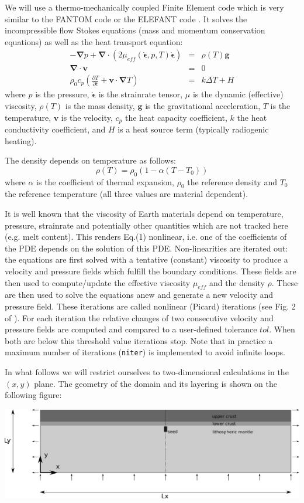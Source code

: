 \documentclass[a4paper]{article}
\begin{document}
We will use a thermo-mechanically coupled Finite Element code which is very similar to the FANTOM code  \cite{thie11} or the ELEFANT code \cite{latb17}. It solves the incompressible flow Stokes equations (mass and momentum conservation equations) as well as the heat transport equation:
\begin{eqnarray}
-{\bm \nabla}p + {\bm \nabla} \cdot (2\mu_{eff}(\dot{\bm \epsilon},p,T)\dot{\bm \epsilon}) &=& \rho(T) {\bm g} \\
{\bm \nabla}\cdot {\bm v} &=& 0 \\
\rho_0 c_p \left(\frac{\partial T}{\partial t} + {\bm v}\cdot{\bm \nabla} T \right) &=& k \Delta T +H
\end{eqnarray}
where $p$ is the pressure, $\dot{\bm \epsilon}$ is the strainrate tensor, $\mu$ is the dynamic (effective) viscosity, $\rho(T)$ is the mass density, ${\bm g}$ is the gravitational acceleration, $T$ is the temperature, ${\bm v}$ is the velocity, $c_p$ the heat capacity coefficient, $k$ the heat conductivity coefficient, and $H$ is a heat source term (typically radiogenic heating).

The density depends on temperature as follows:
\[
\rho(T) = \rho_0 (1-\alpha(T-T_0))
\]
where $\alpha$ is the coefficient of thermal expansion, $\rho_0$ the reference density and $T_0$ the reference temperature
(all three values are material dependent).

It is well known that the viscosity of Earth materials depend on temperature, pressure, strainrate and potentially other quantities which are not tracked here (e.g. melt content). This renders Eq.(1) nonlinear, i.e. one of the coefficients of the PDE depends on the solution of this PDE. Non-linearities are iterated out: the equations are first solved with a tentative (constant) viscosity to produce a velocity and pressure fields which fulfill the boundary conditions. These fields are then used to compute/update the effective viscosity $\mu_{eff}$ and the density $\rho$. These are then used to solve the equations anew and generate a new velocity and pressure field. These iterations are called nonlinear (Picard) iterations (see Fig. 2 of \cite{thie11}). For each iteration the relative changes of two consecutive velocity and pressure  fields are computed and compared to a user-defined tolerance $tol$. When both are below this threshold value iterations stop. Note that in practice a maximum number of iterations ({\tt niter}) is implemented to avoid infinite loops.

In what follows we will restrict ourselves to two-dimensional calculations in the $(x,y)$ plane. The geometry of the domain and its layering is shown on the following figure:
\begin{center}
\includegraphics[width=15cm]{images/drawing}
\end{center}
 
\end{document}
